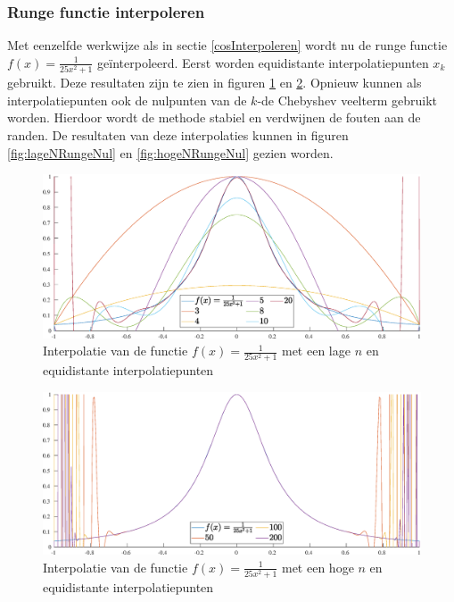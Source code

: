 \documentclass[a4paper, 12pt, titlepage, fleqn]{article}
\begin{document}
\newpage
\subsubsection{Runge functie interpoleren}
Met eenzelfde werkwijze als in sectie \ref{cosInterpoleren} wordt nu de runge functie $f(x) = \frac{1}{25x^2+1}$ ge\"interpoleerd. Eerst worden equidistante interpolatiepunten $x_k$ gebruikt. Deze resultaten zijn te zien in figuren \ref{fig:lageNRungeEqui} en \ref{fig:hogeNRungeEqui}. Opnieuw kunnen als interpolatiepunten ook de nulpunten van de $k$-de Chebyshev veelterm gebruikt worden. Hierdoor wordt de methode stabiel en verdwijnen de fouten aan de randen. De resultaten van deze interpolaties kunnen in figuren \ref{fig:lageNRungeNul} en \ref{fig:hogeNRungeNul} gezien worden.

\begin{figure}
\centering
\includegraphics[scale=0.4]{../Afbeeldingen/runge_equi_laag.eps}
\caption{Interpolatie van de functie $f(x) = \frac{1}{25x^2+1}$ met een lage $n$ en equidistante interpolatiepunten}
\label{fig:lageNRungeEqui}
\end{figure}

\begin{figure}
\centering
\includegraphics[scale=0.4]{../Afbeeldingen/runge_equi_hoog.eps}
\caption{Interpolatie van de functie $f(x) = \frac{1}{25x^2+1}$ met een hoge $n$ en equidistante interpolatiepunten}
\label{fig:hogeNRungeEqui}
\end{figure}
\end{document}
